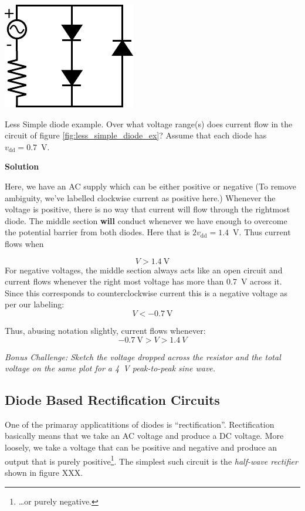 \documentclass{tufte-book}
\newcommand\Solution{\par\textbf{\textsf{Solution}}\par\medskip}
\begin{document}
\begin{marginfigure}
  \includegraphics[]{less_simple_diode_ex}
  \caption{Less simple diode example.}
  \label{fig:less_simple_diode_ex}
\end{marginfigure}

\begin{myexample}[label = ex:less_simple_diode]{Less Simple diode example.}
Over what voltage range(s) does current flow in the circuit of figure \ref{fig:less_simple_diode_ex}? Assume that each diode has $v_\text{dd} = 0.7$~V.
\Solution
Here, we have an AC supply which can be either positive or negative (To remove ambiguity, we've labelled clockwise current as positive here.) Whenever the voltage is positive, there is no way that current will flow through the rightmost diode. The middle section \textbf{will} conduct whenever we have enough to overcome the potential barrier from both diodes. Here that is $2v_\text{dd} = 1.4$~V. Thus current flows when 

$$
V>1.4~\text{V}
$$
For negative voltages, the middle section always acts like an open circuit and current flows whenever the right most voltage has more than 0.7~V across it. Since this corresponds to counterclockwise current this is a negative voltage as per our labeling:
$$
V<-0.7~\text{V}
$$

Thus, abusing notation slightly, current flows whenever:
$$
-0.7~\text{V} > V > 1.4~V
$$

\textit{Bonus Challenge: Sketch the voltage dropped across the resistor and the total voltage on the same plot for a 4~V peak-to-peak sine wave.}
\end{myexample}

\subsection{Diode Based Rectification Circuits}
One of the primaray applicatitions of diodes is ``rectification''. Rectification basically means that we take an AC voltage and produce a DC voltage. More loosely, we take a voltage that can be positive and negative and produce an output that is purely positive\footnote{\ldots or purely negative.}. The simplest such circuit is the \textit{half-wave rectifier} shown in figure  XXX.
\end{document}
